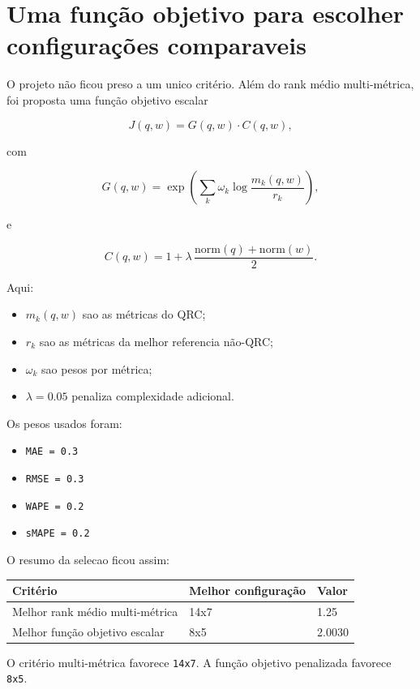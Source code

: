 \documentclass[12pt]{article}
\providecommand{\tightlist}{%
          \setlength{\itemsep}{0pt}\setlength{\parskip}{0pt}}
\begin{document}
\section{Uma função objetivo para escolher configurações comparaveis}\label{7-uma-funuxe7uxe3o-objetivo-para-escolher-configurauxe7uxf5es-comparaveis}

O projeto não ficou preso a um unico critério. Além do rank médio multi-métrica, foi proposta uma função objetivo escalar

\[
J(q, w) = G(q, w) \cdot C(q, w),
\]

com

\[
G(q, w) = \exp\left(\sum_k \omega_k \log\frac{m_k(q, w)}{r_k}\right),
\]

e

\[
C(q, w) = 1 + \lambda \, \frac{\mathrm{norm}(q) + \mathrm{norm}(w)}{2}.
\]

Aqui:

\begin{itemize}
\tightlist
\item
  \(m_k(q, w)\) sao as métricas do QRC;
\item
  \(r_k\) sao as métricas da melhor referencia não-QRC;
\item
  \(\omega_k\) sao pesos por métrica;
\item
  \(\lambda = 0.05\) penaliza complexidade adicional.
\end{itemize}

Os pesos usados foram:

\begin{itemize}
\tightlist
\item
  \texttt{MAE\ =\ 0.3}
\item
  \texttt{RMSE\ =\ 0.3}
\item
  \texttt{WAPE\ =\ 0.2}
\item
  \texttt{sMAPE\ =\ 0.2}
\end{itemize}

O resumo da selecao ficou assim:

\begin{longtable}[]{@{}lll@{}}
\toprule\noalign{}
Critério & Melhor configuração & Valor \\
\midrule\noalign{}
\endhead
\bottomrule\noalign{}
\endlastfoot
Melhor rank médio multi-métrica & 14x7 & 1.25 \\
Melhor função objetivo escalar & 8x5 & 2.0030 \\
\end{longtable}

O critério multi-métrica favorece \texttt{14x7}. A função objetivo penalizada favorece \texttt{8x5}.
\end{document}
